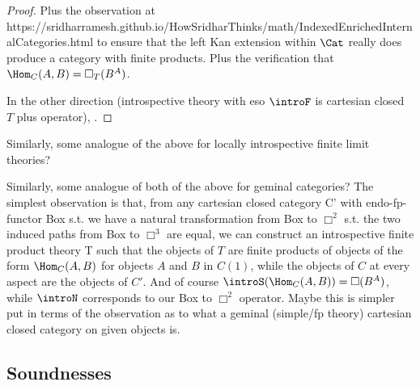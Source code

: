 \begin{proof}
Plus the observation at https://sridharramesh.github.io/HowSridharThinks/math/IndexedEnrichedInternalCategories.html to ensure that the left Kan extension within $\Cat$ really does produce a category with finite products. Plus the verification that $\Hom_C(A, B) = \Box_T (B^A)$.

In the other direction (introspective theory with eso $\introF$ is cartesian closed $T$ plus operator), \TODO.
\end{proof}
Similarly, some analogue of the above for locally introspective finite limit theories? \TODO

\begin{TODOblock}
Similarly, some analogue of both of the above for geminal categories? The simplest observation is that, from any cartesian closed category C' with endo-fp-functor Box s.t. we have a natural transformation from Box to $\Box^2$ s.t. the two induced paths from Box to $\Box^3$ are equal, we can construct an introspective finite product theory T such that the objects of $T$ are finite products of objects of the form $\Hom_C(A, B)$ for objects $A$ and $B$ in $C(1)$, while the objects of $C$ at every aspect are the objects of $C'$. And of course $\introS(\Hom_C(A, B)) = \Box(B^A)$, while $\introN$ corresponds to our Box to $\Box^2$ operator. Maybe this is simpler put in terms of the observation as to what a geminal (simple/fp theory) cartesian closed category on given objects is.
\end{TODOblock}

\subsection{Soundnesses}
\TODO

\fileend